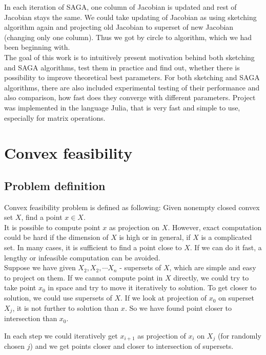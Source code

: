 \documentclass[11pt]{book}
\begin{document}
In each iteration of SAGA, one column of Jacobian is updated and rest of Jacobian stays the same. We could take updating of Jacobian as using sketching algorithm again and projecting old Jacobian to superset of new Jacobian (changing only one column). Thus we got by circle to algorithm, which we had been beginning with.\\

The goal of this work is to intuitively present motivation behind both sketching and SAGA algorithms, test them in practice and find out, whether there is possibility to improve theoretical best parameters. For both sketching and SAGA algorithms, there are also included experimental testing of their performance and also comparison, how fast does they converge with different parameters. Project was implemented in the language Julia, that is very fast and simple to use, especially for matrix operations.

\chapter{Convex feasibility}

\section{Problem definition}

Convex feasibility problem is defined as following: Given nonempty closed convex set $X$, find a point $x \in X.$\\

It is possible to compute point $x$ as projection on $X$. However, exact computation could be hard if the dimension of $X$ is high or in general, if $X$ is a complicated set. In many cases, it is sufficient to find a point close to $X$. If we can do it fast, a lengthy or infeasible computation can be avoided.\\

Suppose we have given $X_2 , X_2 , \cdots X_n$ - supersets of $X$, which are simple and easy to project on them. If we cannot compute point in $X$ directly, we could try to take point $x_0$ in space and try to move it iteratively to solution. To get closer to solution, we could use supersets of $X$. If we look at projection of $x_0$ on superset $X_j$, it is not further to solution than $x$. So we have found point closer to intersection than $x_0$.

In each step we could iteratively get $x_{i+1}$ as projection of $x_i$ on $X_j$ (for randomly chosen $j$) and we get points closer and closer to intersection of supersets.
\end{document}
